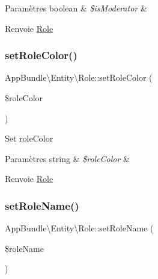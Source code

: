 \begin{DoxyParams}[1]{Paramètres}
boolean & {\em \$is\+Moderator} & \\
\hline
\end{DoxyParams}
\begin{DoxyReturn}{Renvoie}
\hyperlink{classAppBundle_1_1Entity_1_1Role}{Role} 
\end{DoxyReturn}
\mbox{\label{classAppBundle_1_1Entity_1_1Role_a9384e7e7881d3aac98361beb52dbbf6b}} 
\subsubsection{\texorpdfstring{set\+Role\+Color()}{setRoleColor()}}
{\footnotesize\ttfamily App\+Bundle\textbackslash{}\+Entity\textbackslash{}\+Role\+::set\+Role\+Color (\begin{DoxyParamCaption}\item[{}]{\$role\+Color }\end{DoxyParamCaption})}

Set role\+Color


\begin{DoxyParams}[1]{Paramètres}
string & {\em \$role\+Color} & \\
\hline
\end{DoxyParams}
\begin{DoxyReturn}{Renvoie}
\hyperlink{classAppBundle_1_1Entity_1_1Role}{Role} 
\end{DoxyReturn}
\mbox{\label{classAppBundle_1_1Entity_1_1Role_a89328bdf2bb14c5c3f75bdafc2c26349}} 
\subsubsection{\texorpdfstring{set\+Role\+Name()}{setRoleName()}}
{\footnotesize\ttfamily App\+Bundle\textbackslash{}\+Entity\textbackslash{}\+Role\+::set\+Role\+Name (\begin{DoxyParamCaption}\item[{}]{\$role\+Name }\end{DoxyParamCaption})}

